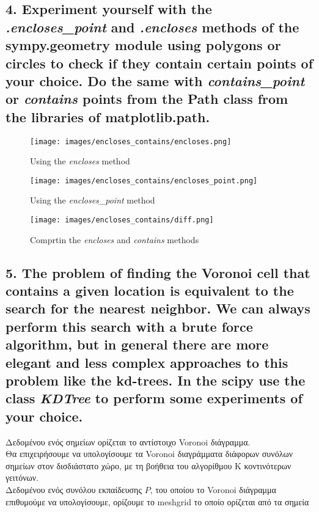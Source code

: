 \documentclass[12pt]{article}
\newenvironment{matlab}
	{\begin{figure}[H]\centering\captionsetup{justification=centering}}
	{\end{figure}}
\begin{document}
\subsection*{4. Experiment yourself with the \textit{.encloses\_point} and \textit{.encloses} methods of the
\textbf{sympy.geometry} module using polygons or circles to check if they contain certain points of
your choice. Do the same with \textit{contains\_point} or \textit{contains} points from the Path class from the
libraries of \textbf{matplotlib.path}.}

\begin{matlab}
    \texttt{[image: images/encloses\_contains/encloses.png]}
    \caption{Using the \textit{encloses} method}
\end{matlab}

\begin{matlab}
    \texttt{[image: images/encloses\_contains/encloses\_point.png]}
    \caption{Using the \textit{encloses\_point} method}
\end{matlab}

\begin{matlab}
    \texttt{[image: images/encloses\_contains/diff.png]}
    \caption{Comprtin the \textit{encloses} and \textit{contains} methods}
\end{matlab}

\pagebreak

\subsection*{5. The problem of finding the Voronoi cell that contains a given location is
equivalent to the search for the nearest neighbor. We can always perform this search with a
brute force algorithm, but in general there are more elegant and less complex approaches to
this problem like the kd-trees. In the \textbf{scipy} use the class \textit{KDTree} to perform some experiments
of your choice.}

Δεδομένου ενός σημείων ορίζεται το αντίστοιχο Voronoi διάγραμμα. \\

Θα επιχειρήσουμε να υπολογίσουμε τα Voronoi διαγράμματα διάφορων συνόλων σημείων στον δισδιάστατο χώρο,
με τη βοήθεια του αλγορίθμου K κοντινότερων γειτόνων. \\

Δεδομένου ενός συνόλου εκπαίδευσης \( P \), του οποίου το Voronoi διάγραμμα επιθυμούμε
να υπολογίσουμε, ορίζουμε το meshgrid το οποίο ορίζεται από τα σημεία \\
\end{document}
